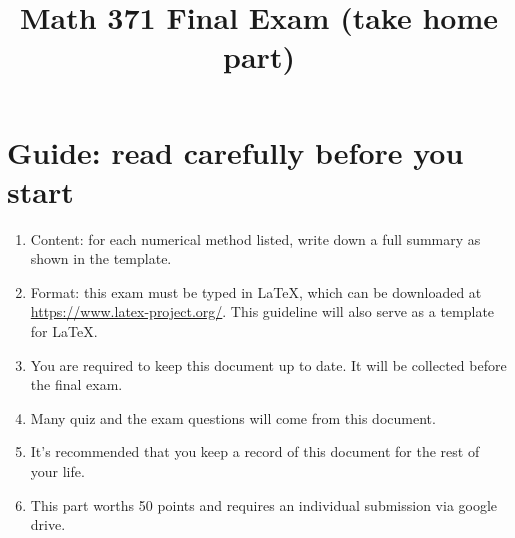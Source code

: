 \documentclass{article}
\title{Math 371 Final Exam (take home part) }
\date
\begin{document}
	\maketitle
	\large
	\section{Guide: read carefully before you start}
	\begin{enumerate}
		\item Content: for each numerical method listed, write down a full summary as shown in the template.
		\item Format: this exam must be typed in LaTeX, which can be downloaded at \url{https://www.latex-project.org/}. This guideline will also serve as a template for LaTeX.
		\item You are required to keep this document up to date. It will be collected before the final exam. 
		\item Many quiz and the exam questions will come from this document.
		\item It's recommended that you keep a record of this document for the rest of your life.
		\item This part worths 50 points and requires an individual submission via google drive.
	\end{enumerate}
\end{document}
